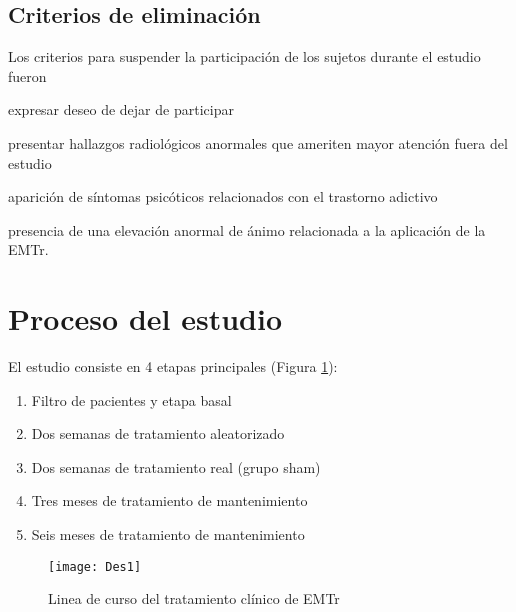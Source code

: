 \subsection{Criterios de eliminación}
Los criterios para suspender la participación de los sujetos durante el estudio fueron
\begin{enumerate*}[label=\emph{\alph*}), before=\unskip{: }, itemjoin={{; }}, itemjoin*={{, y }}]
    \item expresar deseo de dejar de participar
    \item presentar hallazgos radiológicos anormales que ameriten mayor atención fuera del estudio
    \item aparición de síntomas psicóticos relacionados con el trastorno adictivo
    \item presencia de una elevación anormal de ánimo relacionada a la aplicación de la EMTr.
\end{enumerate*}

\section{Proceso del estudio}
El estudio consiste en 4 etapas principales (Figura \ref{fig:txTMS}):
\begin{enumerate}[start=0,leftmargin=3\parindent,align=left,label=Etapa \arabic*:]
    \item Filtro de pacientes y etapa basal
    \item Dos semanas de tratamiento aleatorizado
    \item[Etapa 1-4:] Dos semanas de tratamiento real (grupo sham)
    \item Tres meses de tratamiento de mantenimiento
    \item Seis meses de tratamiento de mantenimiento
\end{enumerate}

\begin{figure}[H]
    \centering
    \texttt{[image: Des1]}
    \caption{Linea de curso del tratamiento clínico de EMTr}
    \label{fig:txTMS}
\end{figure}

